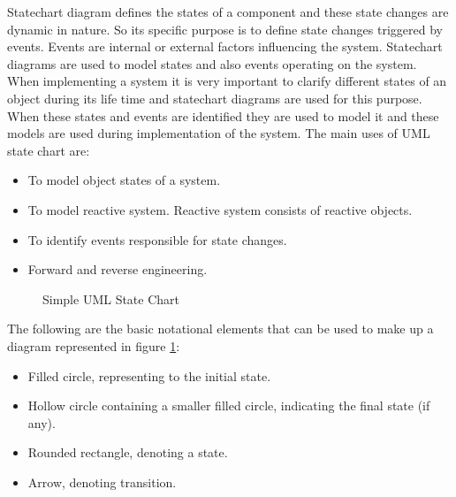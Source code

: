 Statechart diagram defines the states of a component and these state changes are dynamic in nature. So its specific purpose is to define state changes triggered by events. Events are internal or external factors influencing the system. Statechart diagrams are used to model states and also events operating on the system. When implementing a system it is very important to clarify different states of an object during its life time and statechart diagrams are used for this purpose. When these states and events are identified they are used to model it and these models are used during implementation of the system. The main uses of UML state chart are:
\begin{itemize}
	\item To model object states of a system.
	\item To model reactive system. Reactive system consists of reactive objects.
	\item To identify events responsible for state changes.
	\item Forward and reverse engineering.
\end{itemize}

\begin{figure}[htbp]
	\centering
	\label{simple_stateChart}
	\caption{Simple UML State Chart}
\end{figure}

The following are the basic notational elements that can be used to make up a diagram represented in figure \ref{simple_stateChart}:
\begin{itemize}
	\item Filled circle, representing to the initial state.	
	\item Hollow circle containing a smaller filled circle, indicating the final state (if any).	
	\item Rounded rectangle, denoting a state.	
	\item Arrow, denoting transition.	
\end{itemize}

